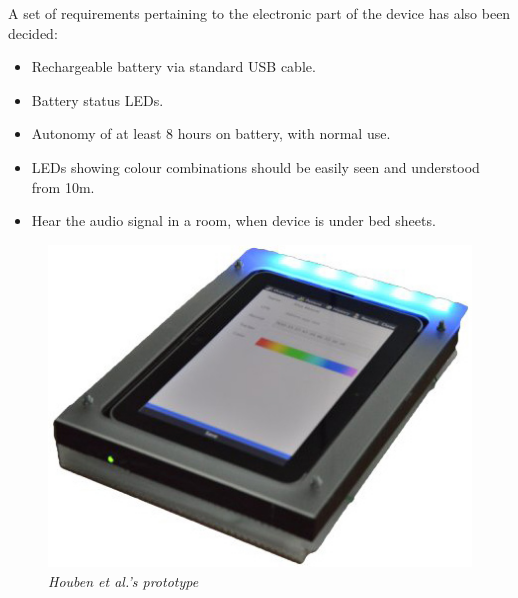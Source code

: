 A set of requirements pertaining to the electronic part of the device has also been decided:

\begin{itemize} \itemsep0em
	\item Rechargeable battery via standard USB cable.
	\item Battery status LEDs.
	\item Autonomy of at least 8 hours on battery, with normal use.
	\item LEDs showing colour combinations should be easily seen and understood from 10m.
	\item Hear the audio signal in a room, when device is under bed sheets.
\end{itemize}

\begin{figure}[h]
\setlength{\belowcaptionskip}{-10mm}
\begin{center}
\includegraphics[scale=.5]{figures/old-hypr.jpg}
\caption{\small {\it {Houben et al.'s prototype}}} \label{fig:old-hypr}
\end{center}
\end{figure}
